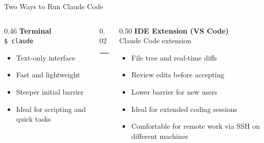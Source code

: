 \documentclass[aspectratio=169, 10pt]{beamer}
\begin{document}
\begin{frame}{Two Ways to Run Claude Code}
  \begin{columns}[T]
    \begin{column}{0.46\textwidth}
      \centering
      \textbf{\color{biokteal}Terminal}\\[0.5em]
      \texttt{\$ claude}\\[0.4em]
      \begin{itemize}[label=\textbullet]\setlength\itemsep{4pt}
        \item Text-only interface
        \item Fast and lightweight
        \item Steeper initial barrier
        \item Ideal for scripting and quick tasks
      \end{itemize}
    \end{column}
    \begin{column}{0.02\textwidth}
      \textcolor{codeframe}{\rule{0.4pt}{5cm}}
    \end{column}
    \begin{column}{0.50\textwidth}
      \centering
      \textbf{\color{biokteal}IDE Extension (VS Code)}\\[0.5em]
      {\small Claude Code extension}\\[0.4em]
      \begin{itemize}[label=\textbullet]\setlength\itemsep{4pt}
        \item File tree and real-time diffs
        \item Review edits before accepting
        \item Lower barrier for new users
        \item Ideal for extended coding sessions
        \item Comfortable for remote work via SSH on different machines
      \end{itemize}
    \end{column}
  \end{columns}
\end{frame}
\end{document}

